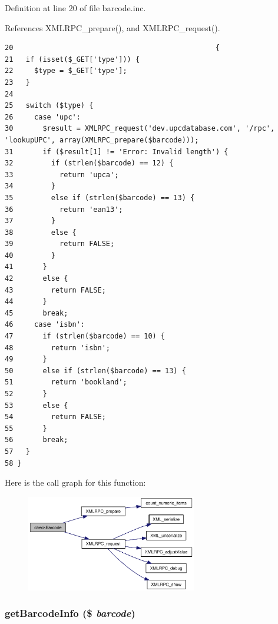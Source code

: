 Definition at line 20 of file barcode.inc.

References XMLRPC\_\-prepare(), and XMLRPC\_\-request().

\begin{Code}\begin{verbatim}20                                                {
21   if (isset($_GET['type'])) {
22     $type = $_GET['type'];
23   }
24 
25   switch ($type) {
26     case 'upc':
30       $result = XMLRPC_request('dev.upcdatabase.com', '/rpc', 'lookupUPC', array(XMLRPC_prepare($barcode)));
31       if ($result[1] != 'Error: Invalid length') {
32         if (strlen($barcode) == 12) {
33           return 'upca';
34         }
35         else if (strlen($barcode) == 13) {
36           return 'ean13';
37         }
38         else {
39           return FALSE;
40         }
41       }
42       else {
43         return FALSE;
44       }
45       break;
46     case 'isbn':
47       if (strlen($barcode) == 10) {
48         return 'isbn';
49       }
50       else if (strlen($barcode) == 13) {
51         return 'bookland';
52       }
53       else {
54         return FALSE;
55       }
56       break;
57   }
58 }
\end{verbatim}
\end{Code}




Here is the call graph for this function:\nopagebreak
\begin{figure}[H]
\begin{center}
\leavevmode
\includegraphics[width=211pt]{barcode_8inc_b34ec866d27061573a5fa623bf314fc1_cgraph}
\end{center}
\end{figure}
\hypertarget{barcode_8inc_e10c37e4f9f9b7c6617a388351a27c99}{
\subsubsection{\setlength{\rightskip}{0pt plus 5cm}getBarcodeInfo (\$ {\em barcode})}}
\label{barcode_8inc_e10c37e4f9f9b7c6617a388351a27c99}


